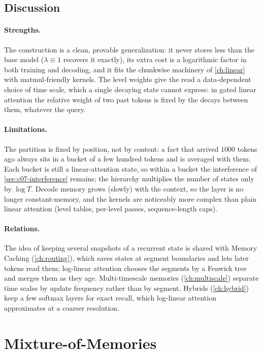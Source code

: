 \subsection{Discussion}

\paragraph{Strengths.} The construction is a clean, provable generalization: it never stores
less than the base model ($\lambda\equiv1$ recovers it exactly), its extra cost is a
logarithmic factor in both training and decoding, and it fits the chunkwise machinery of
\cref{ch:linear} with matmul-friendly kernels. The level weights give the read a
data-dependent choice of time scale, which a single decaying state cannot express: in
gated linear attention the relative weight of two past tokens is fixed by the decays between
them, whatever the query.

\paragraph{Limitations.} The partition is fixed by position, not by content: a fact that
arrived $1000$ tokens ago always sits in a bucket of a few hundred tokens and is averaged with
them. Each bucket is still a linear-attention state, so within a bucket the interference of
\cref{sec:c07-interference} remains; the hierarchy multiplies the number of states only by
$\log T$. Decode memory grows (slowly) with the context, so the layer is no longer
constant-memory, and the kernels are noticeably more complex than plain linear attention
(level tables, per-level passes, sequence-length caps).

\paragraph{Relations.} The idea of keeping several snapshots of a recurrent state is shared
with Memory Caching (\cref{ch:routing}), which saves states at segment boundaries and lets later
tokens read them; log-linear attention chooses the segments by a Fenwick tree and merges them
as they age. Multi-timescale memories (\cref{ch:multiscale}) separate time scales by update
frequency rather than by segment. Hybrids (\cref{ch:hybrid}) keep a few softmax layers for exact
recall, which log-linear attention approximates at a coarser resolution.

\section{Mixture-of-Memories}\label{sec:c07-mom}

